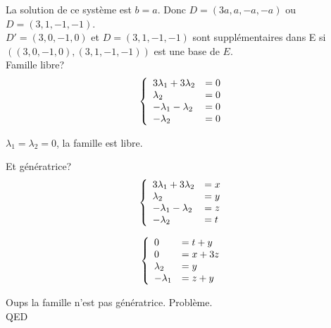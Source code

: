 \documentclass[]{book}
\theoremstyle{definition}
\begin{document}
La solution de ce syst\`eme est $b=a$. Donc $D=(3a,a,-a,-a)$ ou $D=(3,1,-1,-1)$.\\

$D'=(3,0,-1,0)$ et $D=(3,1,-1,-1)$ sont suppl\'ementaires dans E si $((3,0,-1,0),(3,1,-1,-1)) $ est une base de $E$. \\

Famille libre?
$$
\left\{ 
\begin{array}{l l}
3\lambda_1 + 3\lambda_2& = 0 \\
\lambda_2 & = 0 \\
-\lambda_1 -\lambda_2 & = 0 \\
-\lambda_2 & = 0 \\
\end{array}
\right. 
$$

$\lambda_1=\lambda_2=0$, la famille est libre. 

Et g\'en\'eratrice?
$$
\left\{ 
\begin{array}{l l}
3\lambda_1 + 3\lambda_2& = x \\
\lambda_2 & = y \\
-\lambda_1 -\lambda_2 & = z \\
-\lambda_2 & = t \\
\end{array}
\right. 
$$

$$
\left\{ 
\begin{array}{l l}
0 & = t + y\\
0 & = x +3z\\
\lambda_2 & = y \\
-\lambda_1 & = z + y \\
\end{array}
\right. 
$$

Oups la famille n'est pas g\'en\'eratrice. Probl\`eme.\\


QED
\end{document}
